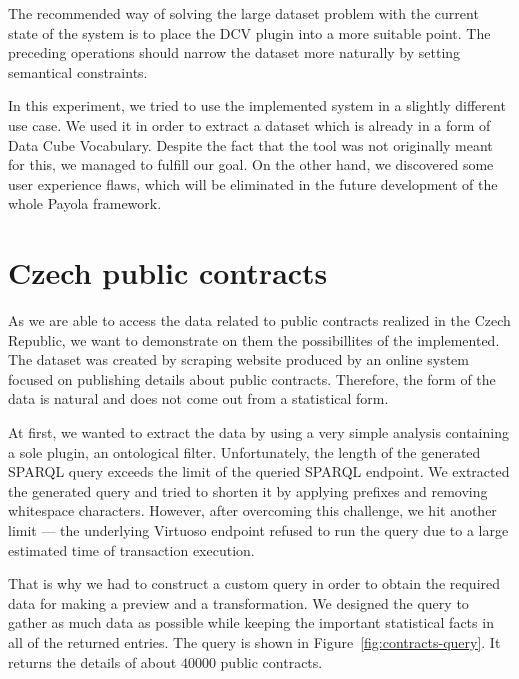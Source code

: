 The recommended way of solving the large dataset problem with the current state of the system
is to place the DCV 
plugin into a more suitable point. The preceding operations should narrow the 
dataset more naturally by setting semantical constraints.

In this experiment, we tried to use the implemented system in a slightly 
different use case. We used it in order to extract a dataset which is already in 
a form of Data Cube Vocabulary. Despite the fact that the tool was not 
originally meant for this, we managed to fulfill our goal. On the other hand, 
we discovered some user experience flaws, which will be eliminated in the future 
development of the whole Payola framework.

\section{Czech public contracts}
As we are able to access the data related to public contracts realized in the 
Czech Republic, we want to demonstrate on them the possibillites of the implemented.
The dataset was created by scraping website produced by an online system focused 
on publishing details about public contracts. Therefore, the form of the data is 
natural and does not come out from a statistical form.

At first, we wanted to extract the data by using a very simple analysis
containing a sole plugin, an ontological filter. Unfortunately, the length
of the generated SPARQL query exceeds the limit of the queried SPARQL endpoint.
We extracted the generated query and tried to shorten it by applying prefixes 
and removing whitespace characters. However, after overcoming this challenge, we 
hit another limit --- the underlying Virtuoso endpoint refused to run the query 
due to a large estimated time of transaction execution.

That is why we had to construct a custom query in order to obtain the required 
data for making a preview and a transformation. We designed the query to 
gather as much data as possible while keeping the important statistical facts in 
all of the returned entries. The query is shown in 
Figure~\ref{fig:contracts-query}. It returns the details of about $40000$ public 
contracts.

